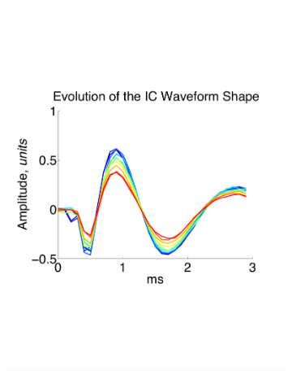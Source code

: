 \begin{center}
\begin{figure}
\begin{subfigure}[b]{.33\textwidth}
\includegraphics[width=\textwidth]{../figs/evohc1}
\caption{}
\label{evohc1}
\end{subfigure}
\begin{subfigure}[b]{.33\textwidth}

\end{subfigure}
\end{figure}
\end{center}
